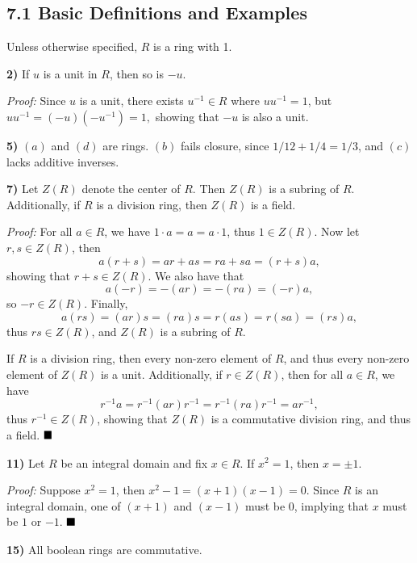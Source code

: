\documentclass[12pt]{article}
\newcommand{\proof}{\textit{Proof: }}
\newcommand{\done}{\ensuremath{\strut\hfill\blacksquare}}
\begin{document}
\pagestyle{fancy}

\setlength{\parindent}{0in}
\setlength{\parskip}{0.15in}

\subsection*{7.1 Basic Definitions and Examples}

Unless otherwise specified, \( R \) is a ring with 1.

\textbf{2)}
If \( u \) is a unit in \( R \), then so is \( -u \).

\proof
Since \( u \) is a unit, there exists \( u^{-1} \in R \) where
\( uu^{-1} = 1 \), but \( uu^{-1} = (-u)(-u^{-1}) = 1, \) showing that \( -u \)
is also a unit.

\textbf{5)} \( (a) \) and \( (d) \) are rings. \( (b) \) fails closure, since
\( 1/12 + 1/4 = 1/3 \), and \( (c) \) lacks additive inverses.

\textbf{7)}
Let \( Z(R) \) denote the center of \( R \).
Then \( Z(R) \) is a subring of \( R \).
Additionally, if \( R \) is a division ring, then \( Z(R) \) is a field.

\proof
For all \( a \in R \), we have \( 1 \cdot a = a = a \cdot 1 \), thus
\( 1 \in Z(R) \).
Now let \( r, s \in Z(R) \), then
\[
	a(r + s) = ar + as = ra + sa = (r + s)a,
\]
showing that \( r + s \in Z(R) \).
We also have that
\[
	a(-r) = -(ar) = -(ra) = (-r)a,
\]
so \( -r \in Z(R) \).
Finally,
\[
	a(rs) = (ar)s = (ra)s = r(as) = r(sa) = (rs)a,
\]
thus \( rs \in Z(R) \), and \( Z(R) \) is a subring of \( R \).

If \( R \) is a division ring, then every non-zero element of \( R \), and thus
every non-zero element of \( Z(R) \) is a unit.
Additionally, if \( r \in Z(R) \), then for all \( a \in R \), we have
\[
	r^{-1}a = r^{-1}(ar)r^{-1} = r^{-1}(ra)r^{-1} = ar^{-1},
\]
thus \( r^{-1} \in Z(R) \), showing that \( Z(R) \) is a commutative division
ring, and thus a field.
\done

\textbf{11)}
Let \( R \) be an integral domain and fix \( x \in R \).
If \( x^2 = 1 \), then \( x = \pm 1 \).

\proof
Suppose \( x^2 = 1 \), then \( x^2 - 1 = (x + 1)(x - 1) = 0 \).
Since \( R \) is an integral domain, one of \( (x + 1) \) and \( (x - 1) \)
must be 0, implying that \( x \) must be \( 1 \) or \( -1 \).
\done

\pagebreak
\textbf{15)}
All boolean rings are commutative.
\end{document}
